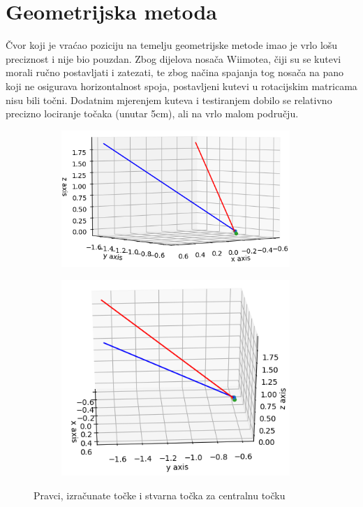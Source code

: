 \documentclass[times, utf8, diplomski]{fer}
\begin{document}
\section{Geometrijska metoda}
Čvor koji je vraćao poziciju na temelju geometrijske metode imao je vrlo lošu preciznost i nije bio pouzdan. Zbog dijelova nosača Wiimotea, čiji su se kutevi morali ručno postavljati i zatezati, te zbog načina spajanja tog nosača na pano koji ne osigurava horizontalnost spoja, postavljeni kutevi u rotacijskim matricama nisu bili točni. Dodatnim mjerenjem kuteva i testiranjem dobilo se relativno precizno lociranje točaka (unutar 5cm), ali na vrlo malom području.

\begin{figure}[h]
\begin{subfigure}[b]{.5\textwidth}
\centering
	\includegraphics[width=0.95\textwidth]{pravci_t7_1}
	\caption*{}
	\label{fig:t7_1}
\end{subfigure}
\begin{subfigure}[b]{.5\textwidth}
	\centering
	\includegraphics[width=0.95\textwidth]{pravci_t7_2}
	\caption*{}
	\label{fig:t7_2}
\end{subfigure}
\caption{Pravci, izračunate točke i stvarna točka za centralnu točku}
\label{fig:t7}
\end{figure}
\end{document}
